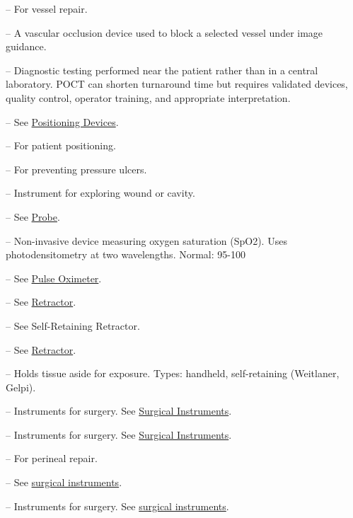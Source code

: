 -- For vessel repair.

-- A vascular occlusion device used to block a selected vessel under image guidance.

-- Diagnostic testing performed near the patient rather than in a central laboratory. POCT can shorten turnaround time but requires validated devices, quality control, operator training, and appropriate interpretation.

-- See \hyperlink{Positioning Devices}{Positioning Devices}.

-- For patient positioning.

-- For preventing pressure ulcers.

-- Instrument for exploring wound or cavity.

-- See \hyperlink{Probe}{Probe}.

-- Non-invasive device measuring oxygen saturation (SpO2). Uses photodensitometry at two wavelengths. Normal: 95-100%

-- See \hyperlink{Pulse Oximeter}{Pulse Oximeter}.

-- See \hyperlink{Retractor}{Retractor}.

-- See Self-Retaining Retractor.

-- See \hyperlink{Retractor}{Retractor}.

-- Holds tissue aside for exposure. Types: handheld, self-retaining (Weitlaner, Gelpi).

-- Instruments for surgery. See \hyperlink{Surgical Instruments}{Surgical Instruments}.

-- Instruments for surgery. See \hyperlink{Surgical Instruments}{Surgical Instruments}.

-- For perineal repair.

-- See \hyperlink{Surgical Instruments}{surgical instruments}.

-- Instruments for surgery. See \hyperlink{Surgical Instruments}{surgical instruments}.


